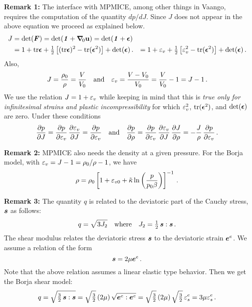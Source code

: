 {\footnotesize
{\bf Remark 1:}  The interface with MPMICE, among other things in Vaango, requires the 
computation of the quantity $dp/dJ$.  Since $J$ does not appear in the above equation we
proceed as explained below.
\[
  \begin{aligned}
   J & = \det(\boldsymbol{F}) = \det(\boldsymbol{\mathit{1}} + \boldsymbol{\nabla}_{\mkern-3.7mu 0}\mathbf{u}) = \det(\boldsymbol{\mathit{1}} + \boldsymbol{\epsilon}) \\
     & = 1 + \text{tr}\boldsymbol{\epsilon} + \tfrac{1}{2}\left[(\text{tr}\boldsymbol{\epsilon})^2 - \text{tr}(\boldsymbol{\epsilon}^2)\right] + \det(\boldsymbol{\epsilon}) \,.
     & = 1 + \varepsilon_v + \tfrac{1}{2}\left[\varepsilon_v^2 - \text{tr}(\boldsymbol{\epsilon}^2)\right] + \det(\boldsymbol{\epsilon}) \,.
  \end{aligned}
\]
Also,
\[
   J = \frac{\rho_0}{\rho} = \frac{V}{V_0} \quad \text{and} \quad
   \varepsilon_v = \frac{V-V_0}{V_0} = \frac{V}{V_0} - 1 = J - 1 \,.
\]
We use the relation $J = 1 + \varepsilon_v$ while keeping in mind that this is {\em true only for
infinitesimal strains and plastic incompressibility} for which 
$\varepsilon_v^2$, $\text{tr}(\boldsymbol{\epsilon}^2)$, and $\det(\boldsymbol{\epsilon})$ are zero.  Under these conditions
\[
   \frac{\displaystyle\partial p}{\displaystyle\partial J} = \frac{\displaystyle\partial p}{\displaystyle\partial \varepsilon_v}\,\frac{\displaystyle\partial \varepsilon_v}{\displaystyle\partial J} = \frac{\displaystyle\partial p}{\displaystyle\partial \varepsilon_v} \quad \text{and} 
   \quad
   \frac{\displaystyle\partial p}{\displaystyle\partial \rho} = \frac{\displaystyle\partial p}{\displaystyle\partial \varepsilon_v}\,\frac{\displaystyle\partial \varepsilon_v}{\displaystyle\partial J}\,\frac{\displaystyle\partial J}{\displaystyle\partial \rho} 
      = -\frac{J}{\rho}\,\frac{\displaystyle\partial p}{\displaystyle\partial \varepsilon_v} \,.
\]

{\bf Remark 2:} MPMICE also needs the density at a given pressure.  For the Borja model, with
$\varepsilon_v = J-1 = \rho_0/\rho -1$, we have
\[
  \rho = \rho_0\left[1 + \varepsilon_{v0} + \tilde{\kappa}\ln\left(\frac{p}{p_0\beta}\right)\right]^{-1}\,.
\]

{\bf Remark 3:}  The quantity $q$ is related to the deviatoric part of the Cauchy stress, $\boldsymbol{s}$
as follows:
\[
   q = \sqrt{3J_2} \quad \text{where} \quad J_2 = \tfrac{1}{2}\,\boldsymbol{s}:\boldsymbol{s} \,.
\]
The shear modulus relates the deviatoric stress $\boldsymbol{s}$ to the deviatoric strain $\boldsymbol{e}^e$.  We
assume a relation of the form
\[
   \boldsymbol{s} = 2\mu\boldsymbol{e}^e \,.
\]
Note that the above relation assumes a linear elastic type behavior.  Then we get the Borja 
shear model:
\[
  q = \sqrt{\tfrac{3}{2}\,\boldsymbol{s}:\boldsymbol{s}} = \sqrt{\tfrac{3}{2}}\,(2\mu)\,\sqrt{\boldsymbol{e}^e:\boldsymbol{e}^e}
     = \sqrt{\tfrac{3}{2}}\,(2\mu)\,\sqrt{\tfrac{3}{2}}\,\varepsilon^e_s = 3\mu\varepsilon^e_s \,.
\]
}



